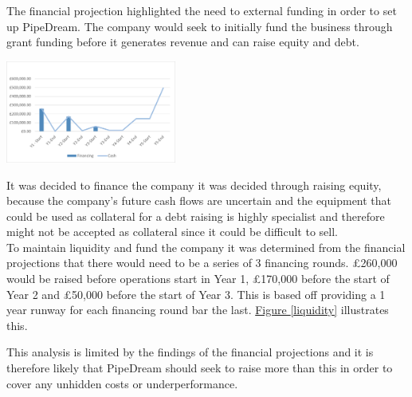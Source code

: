 \documentclass[11pt]{article}		%
\newcommand{\figref}[1]{\hyperref[#1]{Figure \ref*{#1}}}    %
\begin{document}
		  The financial projection highlighted the need to external funding in order to set up PipeDream. The company would seek to initially fund the business through grant funding before it generates revenue and can raise equity and debt. 
		  \begin{floatingfigure}[r]{0.45\textwidth}
    			\centering
    			\includegraphics[width=0.42\textwidth]{CashFlow}
    			\label{liquidity}
	        \end{floatingfigure}
		    \hspace*{3ex} 
			 It was decided to finance the company it was decided through raising equity, because the company's future cash flows are uncertain and the equipment that could be used as collateral for a debt raising is highly specialist and therefore might not be accepted as collateral since it could be difficult to sell.
			    \\ \hspace*{3ex} To maintain liquidity and fund the company it was determined from the financial projections that there would need to be a series of 3 financing rounds. £260,000 would be raised before operations start in Year 1, £170,000 before the start of Year 2 and £50,000 before the start of Year 3. This is based off providing a 1 year runway for each financing round bar the last. \figref{liquidity} illustrates this. 
		    \begin{floatingfigure}[r]{0pt} \end{floatingfigure}
			   \hspace*{3ex} 
			    This analysis is limited by the findings of the financial projections and it is therefore likely that PipeDream should seek to raise more than this in order to cover any unhidden costs or underperformance.
 
            
\end{document}
